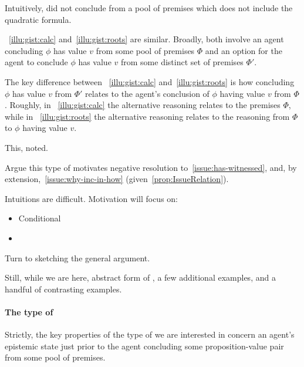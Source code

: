 \begin{note}
  Intuitively, did not conclude from a pool of premises which does not include the quadratic formula.
\end{note}

\begin{note}
  ~\ref{illu:gist:calc} and~\ref{illu:gist:roots} are similar.
  Broadly, both involve an agent concluding \(\phi\) has value \(v\) from some pool of premises \(\Phi\) and an option for the agent to conclude \(\phi\) has value \(v\) from some distinct set of premises \(\Phi'\).

  The key difference between ~\ref{illu:gist:calc} and~\ref{illu:gist:roots} is how concluding \(\phi\) has value \(v\) from \(\Phi'\) relates to the agent's conclusion of \(\phi\) having value \(v\) from \(\Phi\).
  Roughly, in ~\ref{illu:gist:calc} the alternative reasoning relates to the premises \(\Phi\), while in ~\ref{illu:gist:roots} the alternative reasoning relates to the reasoning from \(\Phi\) to \(\phi\) having value \(v\).

  This, noted.

  Argue this type of  motivates negative resolution to~\autoref{issue:has-witnessed}, and, by extension,~\autoref{issue:why-inc-in-how} (given~\autoref{prop:IssueRelation}).

  Intuitions are difficult.
  Motivation will focus on:
  \begin{itemize}
  \item
    Conditional
  \item
  \end{itemize}

  Turn to sketching the general argument.

  Still, while we are here, abstract form of , a few additional examples, and a handful of contrasting examples.
\end{note}

\paragraph{The type of }

\begin{note}
  Strictly, the key properties of the type of  we are interested in concern an agent's epistemic state just prior to the agent concluding some proposition-value pair from some pool of premises.
\end{note}

